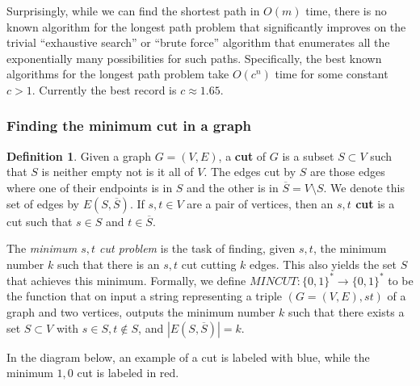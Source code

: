 \documentclass[a4paper, 12pt]{report}
\theoremstyle{remark}
\theoremstyle{definition}
\newtheorem{definition}{Definition}[section]
\begin{document}
Surprisingly, while we can find the shortest path in $O(m)$ time, there is no known algorithm for the longest path problem that significantly improves on the trivial “exhaustive search” or “brute force” algorithm that enumerates all the exponentially many possibilities for such paths. Specifically, the best known algorithms for the longest path problem take $O(c^n)$ time for some constant $c > 1$. Currently the best record is $c \approx 1.65$. 

\subsubsection{Finding the minimum cut in a graph}
\begin{definition}
Given a graph $G = (V, E)$, a \textbf{cut} of $G$ is a subset $S \subset V$ such that $S$ is neither empty not is it all of $V$. The edges cut by $S$ are those edges where one of their endpoints is in $S$ and the other is in $\overline{S} = V \setminus S$. We denote this set of edges by $E(S, \overline{S})$. If $s, t \in V$ are a pair of vertices, then an \textbf{$s, t$ cut} is a cut such that $s \in S$ and $t \in \overline{S}$. 
\end{definition}

The \textit{minimum $s, t$ cut problem} is the task of finding, given $s, t$, the minimum number $k$ such that there is an $s, t$ cut cutting $k$ edges. This also yields the set $S$ that achieves this minimum. Formally, we define $MINCUT: \{0,1\}^* \longrightarrow \{0,1\}^*$ to be the function that on input a string representing a triple $(G = (V, E), s t)$ of a graph and two vertices, outputs the minimum number $k$ such that there exists a set $S \subset V$ with $s \in S, t \not\in S$, and $|E(S, \overline{S})| = k$. 

In the diagram below, an example of a cut is labeled with blue, while the minimum $1, 0$ cut is labeled in red. 
\begin{center}
\end{center}
\end{document}
